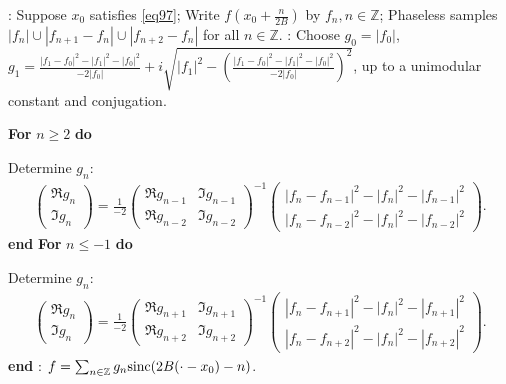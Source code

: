 \documentclass[12pt,oneside,reqno]{amsart}
\newcommand{\Z}{\mathbb{Z}}
\numberwithin{equation}{section}
\begin{document}
\begin{algorithm}[!ht]
\renewcommand{\algorithmicrequire}{\textbf{Input:}}
\renewcommand{\algorithmicensure}{\textbf{Output:}}
\caption{Reconstruct $f$ in $PW_B^2$ from structured phaseless samples, up to a unimodular constant and conjugation}\label{alg1}
\begin{algorithmic}[1]
	: Suppose $x_0$ satisfies \eqref{eq97}; Write $f(x_0+\frac{n}{2B})$ by $f_n, n\in \Z$; Phaseless samples $|f_n| \cup |f_{n+1} - f_n| \cup |f_{n+2} - f_n|$ for all $n\in \Z$.
	: Choose $g_0 = |f_0|$, $ g_1= \frac{|f_1-f_0|^2 - |f_1|^2 - |f_0|^2}{-2{|f_0|}} + i \sqrt{|f_1|^2 - (\frac{|f_1-f_0|^2 - |f_1|^2 - |f_0|^2}{-2{|f_0|}})^2}$, up to a unimodular constant and conjugation.
	
	\State \textbf{For} $n\ge 2$ \textbf{do}
	
	Determine $g_{n}$: 
	\begin{align*}
		\begin{pmatrix}
			\Re g_{n} \\
			\Im g_{n}
		\end{pmatrix}
		= \frac{1}{-2}  \begin{pmatrix}
			\Re g_{n-1} & \Im g_{n-1} \\
			\Re g_{n-2} & \Im g_{n-2}
		\end{pmatrix}^{-1}
		\begin{pmatrix}
			{|f_{n} - f_{n-1}|^2 - |f_{n}|^2 - |f_{n-1}|^2} \\
			{|f_{n} - f_{n-2}|^2 - |f_{n}|^2 - |f_{n-2}|^2}
		\end{pmatrix}.
	\end{align*}
	\textbf{end}
	\State \textbf{For} $n\le -1$ \textbf{do}
	
	Determine $g_{n}$:
	\begin{align*}
		\begin{pmatrix}
			\Re g_{n} \\
			\Im g_{n}
		\end{pmatrix} 
		= \frac{1}{-2} \begin{pmatrix}
			\Re g_{n+1} & \Im g_{n+1} \\
			\Re g_{n+2} & \Im g_{n+2}
		\end{pmatrix}^{-1}
		\begin{pmatrix}
			{|f_{n} - f_{n+1}|^2 - |f_{n}|^2 - |f_{n+1}|^2} \\
			{|f_{n} - f_{n+2}|^2 - |f_{n}|^2 - |f_{n+2}|^2}
		\end{pmatrix}.
	\end{align*}
	\textbf{end}
	: $f=\sum_{n\in \Z} g_n {\rm sinc}(2B(\cdot - x_0) - n)$.
\end{algorithmic}

\end{algorithm}
\end{document}
